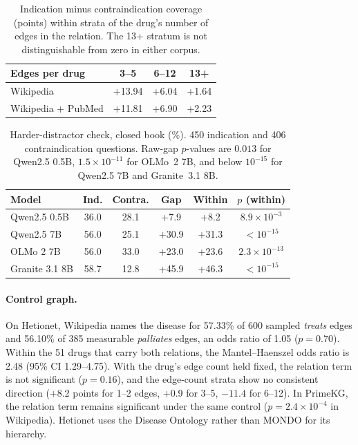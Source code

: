 \documentclass[letterpaper]{article} %
\begin{document}
\begin{table}[h]
\centering
\small
\begin{tabular}{lccc}
\toprule
Edges per drug & 3--5 & 6--12 & 13+ \\
\midrule
Wikipedia & +13.94 & +6.04 & +1.64 \\
Wikipedia + PubMed & +11.81 & +6.90 & +2.23 \\
\bottomrule
\end{tabular}
\caption{Indication minus contraindication coverage (points) within strata of
the drug's number of edges in the relation. The 13+ stratum is not
distinguishable from zero in either corpus.}
\label{tab:degree}
\end{table}

\begin{table}[h]
\centering
\small
\setlength{\tabcolsep}{4pt}
\begin{tabular}{lccccc}
\toprule
Model & Ind. & Contra. & Gap & Within & $p$ (within) \\
\midrule
Qwen2.5 0.5B & 36.0 & 28.1 & +7.9 & +8.2 & $8.9\times10^{-3}$ \\
Qwen2.5 7B & 56.0 & 25.1 & +30.9 & +31.3 & $<10^{-15}$ \\
OLMo 2 7B & 56.0 & 33.0 & +23.0 & +23.6 & $2.3\times10^{-13}$ \\
Granite 3.1 8B & 58.7 & 12.8 & +45.9 & +46.3 & $<10^{-15}$ \\
\bottomrule
\end{tabular}
\caption{Harder-distractor check, closed book (\%). 450 indication and 406
contraindication questions. Raw-gap $p$-values are $0.013$ for Qwen2.5 0.5B,
$1.5\times10^{-11}$ for OLMo~2 7B, and below $10^{-15}$ for Qwen2.5 7B and
Granite~3.1 8B.}
\label{tab:distractor_full}
\end{table}

\paragraph{Control graph.}
On Hetionet, Wikipedia names the disease for 57.33\% of 600 sampled
\emph{treats} edges and 56.10\% of 385 measurable \emph{palliates} edges, an
odds ratio of 1.05 ($p = 0.70$). Within the 51 drugs that carry both
relations, the Mantel--Haenszel odds ratio is 2.48 (95\% CI 1.29--4.75). With
the drug's edge count held fixed, the relation term is not significant
($p = 0.16$), and the edge-count strata show no consistent direction (+8.2
points for 1--2 edges, +0.9 for 3--5, $-11.4$ for 6--12). In PrimeKG, the
relation term remains significant under the same control ($p = 2.4\times10^{-4}$
in Wikipedia). Hetionet uses the Disease Ontology rather than MONDO for its
hierarchy.
\end{document}

